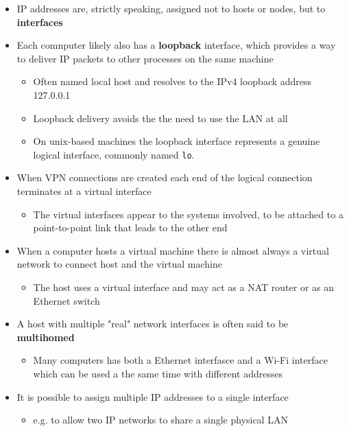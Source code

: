 \documentclass[11pt]{article}
\providecommand{\tightlist}{%
      \setlength{\itemsep}{0pt}\setlength{\parskip}{0pt}}
\begin{document}
\begin{itemize}
\tightlist
\item
  IP addresses are, strictly speaking, assigned not to hosts or nodes,
  but to \textbf{interfaces}
\item
  Each comnputer likely also has a \textbf{loopback} interface, which
  provides a way to deliver IP packets to other processes on the same
  machine

  \begin{itemize}
  \tightlist
  \item
    Often named local host and resolves to the IPv4 loopback address
    127.0.0.1
  \item
    Loopback delivery avoids the the need to use the LAN at all
  \item
    On unix-based machines the loopback interface represents a genuine
    logical interface, commonly named \texttt{lo}.
  \end{itemize}
\item
  When VPN connections are created each end of the logical connection
  terminates at a virtual interface

  \begin{itemize}
  \tightlist
  \item
    The virtual interfaces appear to the systems involved, to be
    attached to a point-to-point link that leads to the other end
  \end{itemize}
\item
  When a computer hosts a virtual machine there is almost always a
  virtual network to connect host and the virtual machine

  \begin{itemize}
  \tightlist
  \item
    The host uses a virtual interface and may act as a NAT router or as
    an Ethernet switch
  \end{itemize}
\item
  A host with multiple "real" network interfaces is often said to be
  \textbf{multihomed}

  \begin{itemize}
  \tightlist
  \item
    Many computers has both a Ethernet interfasce and a Wi-Fi interface
    which can be used a the same time with different addresses
  \end{itemize}
\item
  It is possible to assign multiple IP addresses to a single interface

  \begin{itemize}
  \tightlist
  \item
    e.g. to allow two IP networks to share a single physical LAN
  \end{itemize}
\end{itemize}
\end{document}

